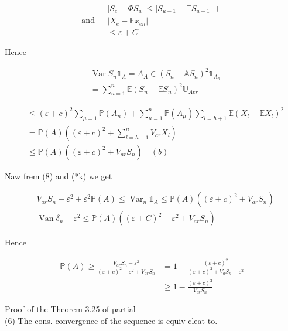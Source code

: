 \documentclass[11pt]{amsbook}
\theoremstyle{plain}%
\theoremstyle{definition}
\theoremstyle{remark}
\begin{document}
$$
\text { and } \begin{aligned}
&\left|S_{e}-\Phi S_{u}\right| \leq\left|S_{u-1}-\mathbb{E} S_{u-1}\right|+ \\
&\left|X_{e}-\mathbb{E} x_{e n}\right| \\
& \leq \varepsilon+C
\end{aligned}
$$

Hence

$$
\begin{aligned}
& \operatorname{Var} S_{n} \mathbb{1}_{A}=A_{A} \in\left(S_{n}-\mathbb{A} S_{n}\right)^{2} \mathbb{1}_{A_{n}} \\
& =\sum_{n=1}^{n} \mathbb{E}\left(S_{n}-\mathbb{E} S_{n}\right)^{2} \mathbb{U}_{A e r}
\end{aligned}
$$

$$
\begin{aligned}
& \leq(\varepsilon+c)^{2} \sum_{\mu=1} \mathbb{P}\left(A_{n}\right)+\sum_{\mu=1}^{n} \mathbb{P}\left(A_{\mu}\right) \sum_{l=h+1} \mathbb{E}\left(X_{l}-\mathbb{E} X_{l}\right)^{2} \\
& =\mathbb{P}(A)\left((\varepsilon+c)^{2}+\sum_{l=h+1}^{n} V_{a r} X_{l}\right) \\
& \leq \mathbb{P}(A)\left((\varepsilon+c)^{2}+V_{a r} S_{n}\right) \quad(b)
\end{aligned}
$$

Naw frem (8) and (*k) we get

$$
\begin{aligned}
& V_{a r} S_{n}-\varepsilon^{2}+\varepsilon^{2} \mathbb{P}(A) \leq \operatorname{Var}_{n} \mathbb{1}_{A} \leq \mathbb{P}(A)\left((\varepsilon+c)^{2}+V_{a r} S_{n}\right) \\
& \operatorname{Van} \delta_{n}-\varepsilon^{2} \leq \mathbb{P}(A)\left((\varepsilon+C)^{2}-\varepsilon^{2}+V_{a r} S_{n}\right)
\end{aligned}
$$

Hence

$$
\begin{aligned}
\mathbb{P}(A) \geqslant \frac{V_{a r} S_{n}-\varepsilon^{2}}{(\varepsilon+c)^{2}-\varepsilon^{2}+V_{a r} S_{n}} & =1-\frac{(\varepsilon+c)^{2}}{(\varepsilon+c)^{2}+V_{a} S_{n}-\varepsilon^{2}} \\
& \geqslant 1-\frac{(\varepsilon+c)^{2}}{V_{a r} S_{n}}
\end{aligned}
$$

Proof of the Theorem 3.25 of partial\\
(6) The cons. convergence of the sequence is equiv cleat to.
\end{document}
